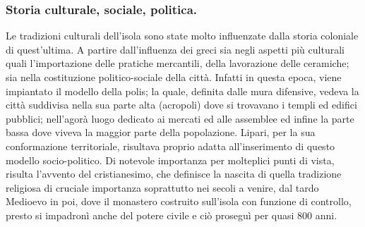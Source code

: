 \documentclass[fleqn,10pt]{SelfArx} %
\begin{document}
\subsubsection{Storia culturale, sociale, politica.}
Le tradizioni culturali dell'isola sono state molto influenzate dalla storia coloniale di quest'ultima. 
A partire dall'influenza dei greci sia negli aspetti più culturali quali l'importazione delle pratiche mercantili, della lavorazione delle ceramiche; sia nella costituzione politico-sociale della città. 
Infatti in questa epoca, viene impiantato il modello della polis; la quale, definita dalle mura difensive, vedeva la città suddivisa nella sua parte alta (acropoli) dove si trovavano i templi ed edifici pubblici; nell'agorà luogo dedicato ai mercati ed alle assemblee ed infine la parte bassa dove viveva la maggior parte della popolazione. 
Lipari, per la sua conformazione territoriale, risultava proprio adatta all'inserimento di questo modello socio-politico.
Di notevole importanza per molteplici punti di vista, risulta l'avvento del cristianesimo, che definisce la  nascita di quella tradizione religiosa di cruciale importanza soprattutto nei secoli a venire, dal tardo Medioevo in poi, dove il monastero costruito sull'isola con funzione di controllo, presto si impadronì anche del potere civile e ciò proseguì per quasi 800 anni.
\end{document}
